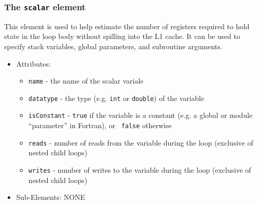 \documentclass{article}
\begin{document}
\subsubsection{The {\tt scalar} element}
  This element is used to help estimate the number of registers required
  to hold state in the loop body without spilling into the L1 cache.
  It can be used to specify stack variables, global parameters, and
  subroutine arguments.
  \begin{itemize}
    \item Attributes:
    \begin{itemize}
      \item {\tt name} - the name of the scalar variale
      \item {\tt datatype} - the type (e.g. {\tt int} or {\tt double})
        of the variable
      \item {\tt isConstant} - {\tt true} if the variable is a constant
        (e.g. a global or module ``parameter'' in Fortran), or {\tt
        false} otherwise
      \item {\tt reads} - number of reads from the variable during
        the loop (exclusive of nested child loops)
      \item {\tt writes} - number of writes to the variable during
        the loop (exclusive of nested child loops)
    \end{itemize}
    \item Sub-Elements: NONE
  \end{itemize}
\end{document}
